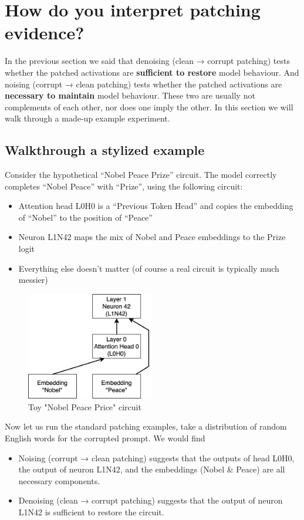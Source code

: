 \documentclass[nonatbib]{article}
\begin{document}
\section{How do you interpret patching evidence?}
\label{sec2}
In the previous section we said that denoising (clean → corrupt patching) tests whether the patched activations are \textbf{sufficient to restore} model behaviour. And noising (corrupt → clean patching)  tests whether the patched activations are \textbf{necessary to maintain} model behaviour. These two are usually not complements of each other, nor does one imply the other. In this section we will walk through a made-up example experiment.

\subsection{Walkthrough a stylized example}
Consider the hypothetical “Nobel Peace Prize” circuit. The model correctly completes “Nobel Peace” with “Prize”, using the following circuit:
\begin{itemize}
    \item Attention head L0H0 is a “Previous Token Head” and copies the embedding of  “Nobel” to the position of “Peace”
    \item Neuron L1N42 maps the mix of Nobel and Peace embeddings to the Prize logit
    \item Everything else doesn’t matter (of course a real circuit is typically much messier)
\end{itemize}
\begin{figure}[H]
    \centering
    \includegraphics[width=0.5\textwidth]{Everything_Activation_Patching.png}
    \caption{Toy "Nobel Peace Price" circuit}
    \label{nobelcircuit}
\end{figure}

Now let us run the standard patching examples, take a distribution of random English words for the corrupted prompt. We would find
\begin{itemize}
    \item Noising (corrupt → clean patching) suggests that the outputs of head L0H0, the output of neuron L1N42, and the embeddings (Nobel \& Peace) are all necessary components.
    \item Denoising (clean → corrupt patching) suggests that the output of neuron L1N42 is sufficient to restore the circuit.
\end{itemize}
\end{document}
